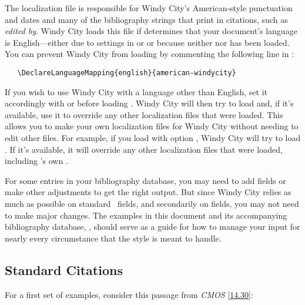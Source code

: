 \documentclass[11pt,letterpaper,oneside]{article}
\begin{document}
The localization file  is responsible for
Windy City's American-style punctuation and dates and many of the
bibliography strings that print in citations, such as \textit{edited
by}. Windy City loads this file if \biblatex determines that your
document's language is English---either due to settings in \babel or
\polyglossia or because neither \babel nor \polyglossia has been
loaded. You can prevent Windy City from loading
 by commenting the following line in
:

\begin{verbatim}
   \DeclareLanguageMapping{english}{american-windycity}
\end{verbatim}

If you wish to use Windy City with a language other than English, set
it accordingly with \babel or \polyglossia before loading \biblatex.
Windy City will then try to load  and,
if it's available, use it to override any other localization files
that were loaded. This allows you to make your own localization files
for Windy City without needing to edit other files. For example, if
you load \babel with option , Windy City will try to load
. If it's available, it will override any
other localization files that were loaded, including \biblatex's own
.

For some entries in your bibliography database, you may need to add
fields or make other adjustments to get the right output. But since
Windy City relies as much as possible on standard \BibTeX\ fields, and
secondarily on \biblatex fields, you may not need to make major
changes. The examples in this document and its accompanying
bibliography database, , should serve as a guide
for how to manage your input for nearly every circumstance that the
style is meant to handle.

\subsection{Standard Citations}
\label{standard}

For a first set of examples, consider this passage from \textit{CMOS}
\ref{14.30}:

\begin{citeonly}
\item \cite[24--25]{morley1995}
\item \cite{schwartz1992}
\item \cite{kaiser1964}
\item \cite[43]{morley1995}
\item \cite[138]{schwartz1992}
\item \cite[189--90]{kaiser1964}
\end{citeonly}
\end{document}
